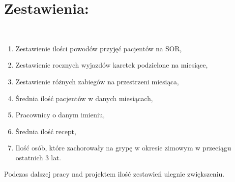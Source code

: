 \section*{Zestawienia:}\\
    \begin{enumerate}
        \itemsep-5pt
\item Zestawienie ilości powodów przyjęć pacjentów na SOR,
\item Zestawienie rocznych wyjazdów karetek podzielone na miesiące,
\item Zestawienie różnych zabiegów na przestrzeni miesiąca,
\item Średnia ilość pacjentów w danych miesiącach,
\item Pracownicy o danym imieniu,
\item Średnia ilość recept,
\item Ilość osób, które zachorowały na grypę w okresie zimowym w przeciągu ostatnich 3 lat.
\end{enumerate}
Podczas dalszej pracy nad projektem ilość zestawień ulegnie zwiększeniu.